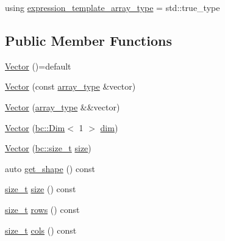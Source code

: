 \begin{DoxyCompactItemize}
\item 
using \hyperlink{structbc_1_1tensors_1_1exprs_1_1Vector_a7a30191739439f338f709feca776585b}{expression\+\_\+template\+\_\+array\+\_\+type} = std\+::true\+\_\+type
\end{DoxyCompactItemize}
\subsection*{Public Member Functions}
\begin{DoxyCompactItemize}
\item 
\hyperlink{structbc_1_1tensors_1_1exprs_1_1Vector_ad7a2aba8225a81c05e95c2db13e2e939}{Vector} ()=default
\item 
\hyperlink{structbc_1_1tensors_1_1exprs_1_1Vector_ab46a08ed533ac62c54e2249d373a4b4d}{Vector} (const \hyperlink{structbc_1_1tensors_1_1exprs_1_1Vector_a73521248268e63ecefe36bca57afcf20}{array\+\_\+type} \&vector)
\item 
\hyperlink{structbc_1_1tensors_1_1exprs_1_1Vector_ac5fec84615ffd6518d962e9fa59000a5}{Vector} (\hyperlink{structbc_1_1tensors_1_1exprs_1_1Vector_a73521248268e63ecefe36bca57afcf20}{array\+\_\+type} \&\&vector)
\item 
\hyperlink{structbc_1_1tensors_1_1exprs_1_1Vector_a20573e41b2964fbbb6a580016c2fcd27}{Vector} (\hyperlink{structbc_1_1Dim}{bc\+::\+Dim}$<$ 1 $>$ \hyperlink{structbc_1_1tensors_1_1exprs_1_1Vector_a15758a965721b43487a91aee601bc794}{dim})
\item 
\hyperlink{structbc_1_1tensors_1_1exprs_1_1Vector_aa8ca71378f0ab15b4dad2f3a01b5ab6b}{Vector} (\hyperlink{namespacebc_aaf8e3fbf99b04b1b57c4f80c6f55d3c5}{bc\+::size\+\_\+t} \hyperlink{structbc_1_1tensors_1_1exprs_1_1Vector_a8a4b5dadd438ab523827426c806fe840}{size})
\item 
auto \hyperlink{structbc_1_1tensors_1_1exprs_1_1Vector_af37170466c5c1d7e33ff4d09e0dc7c2d}{get\+\_\+shape} () const
\item 
\hyperlink{namespacebc_aaf8e3fbf99b04b1b57c4f80c6f55d3c5}{size\+\_\+t} \hyperlink{structbc_1_1tensors_1_1exprs_1_1Vector_a8a4b5dadd438ab523827426c806fe840}{size} () const
\item 
\hyperlink{namespacebc_aaf8e3fbf99b04b1b57c4f80c6f55d3c5}{size\+\_\+t} \hyperlink{structbc_1_1tensors_1_1exprs_1_1Vector_a33681a7db833cc8dd96cc286d6732b4e}{rows} () const
\item 
\hyperlink{namespacebc_aaf8e3fbf99b04b1b57c4f80c6f55d3c5}{size\+\_\+t} \hyperlink{structbc_1_1tensors_1_1exprs_1_1Vector_a1f505852a87c5dc03d5efc97cbe39c41}{cols} () const

\end{DoxyCompactItemize}
